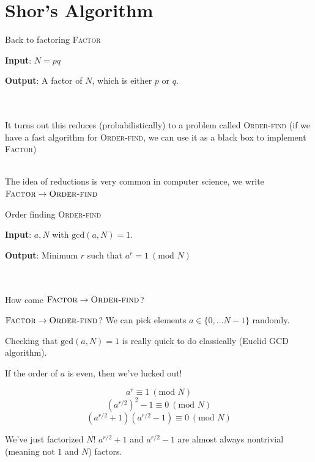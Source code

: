 \documentclass{beamer}
\begin{document}
\section{Shor's Algorithm}
\begin{frame}{Back to factoring}
    \textsc{Factor}
    
    \textbf{Input}: $N = pq$
    
    \textbf{Output}: A factor of $N$, which is either $p$ or $q$. \pause 
    
     \ \\
     \ \\
    
    It turns out this reduces (probabilistically) to a problem called \textsc{Order-find} (if we have a fast algorithm for \textsc{Order-find}, we can use it as a black box to implement \textsc{Factor}) \pause
    
    \ \\
    
    The idea of reductions is very common in computer science, we write $\textsc{Factor} \to \textsc{Order-find}$
\end{frame}
\begin{frame}{Order finding}
    \textsc{Order-find}
    
    \textbf{Input}: $a, N$ with $\text{gcd}(a, N) = 1$.
    
    \textbf{Output}: Minimum $r$ such that $a^{r} = 1 \ (\text{mod } N)$
    
    \pause
    
    \ \\
    \ \\
    
    How come $\textsc{Factor} \to \textsc{Order-find}$?
    
\end{frame}
\begin{frame}{$\textsc{Factor} \to \textsc{Order-find}$?}
    We can pick elements $a \in \{ 0, \ldots N - 1 \}$ randomly. \pause
    
    Checking that $\text{gcd}(a, N) = 1$ is really quick to do classically (Euclid GCD algorithm). \pause
    
    If the order of $a$ is even, then we've lucked out! \pause
    
    $$ a^{r} \equiv 1 \ (\text{mod } N)$$
     $$ (a^{r/2})^2 -1 \equiv 0 \ (\text{mod } N)$$
     $$ (a^{r/2} + 1) (a^{r/2} - 1) \equiv 0 \ (\text{mod } N)$$ \pause
     
    We've just factorized $N$! $a^{r/2} + 1$ and $a^{r/2} - 1$ are almost always nontrivial (meaning not $1$ and $N$) factors.
    
\end{frame}
\end{document}
